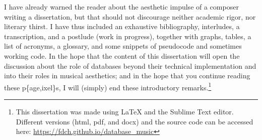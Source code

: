 I have already warned the reader about the aesthetic impulse of a composer writing a dissertation, but that should not discourage neither academic rigor, nor literary thirst. I have thus included an exhaustive bibliography, interludes, a transcription, and a postlude (work in progress), together with graphs, tables, a list of acronyms, a glossary, and some snippets of pseudocode and sometimes working code. In the hope that the content of this dissertation will open the discussion about the role of databases beyond their technical implementation and into their roles in musical aesthetics; and in the hope that you continue reading these p\{age,ixel\}s, I will (simply)  end  these introductory remarks.\footnote{This dissertation was made using \LaTeX{} and the Sublime Text editor. Different versions (html, pdf, and docx) and the source code can be accessed here: \url{https://fdch.github.io/database_music}}
